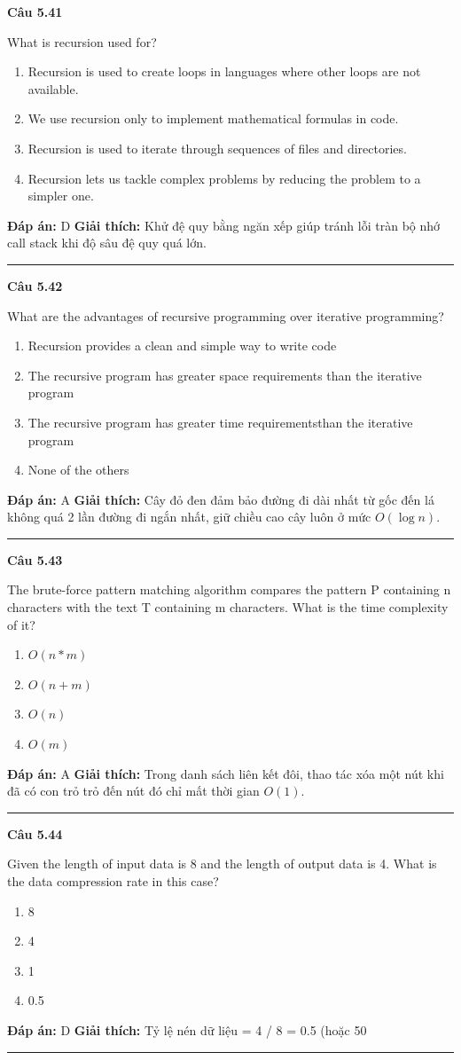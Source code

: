 \documentclass[11pt,a4paper]{article}
\newenvironment{question}[1]{%
  \par\vspace{1em}\noindent\textbf{\large Câu #1}\par\vspace{0.4em}
}{%
  \par\vspace{1em}\hrule\vspace{0.6em}
}
\newenvironment{choices}{%
  \begin{enumerate}[label=\textbf{\Alph*.},leftmargin=2.2em,itemsep=2pt,topsep=3pt]
}{%
  \end{enumerate}
}
\newcommand{\choice}{\item}
\begin{document}
\begin{question}{5.41}
What is recursion used for?
\begin{choices}
\choice Recursion is used to create loops in languages where other loops are not available.
\choice We use recursion only to implement mathematical formulas in code.
\choice Recursion is used to iterate through sequences of files and directories.
\choice Recursion lets us tackle complex problems by reducing the problem to a simpler one.
\end{choices}
\textbf{Đáp án:} D
\textbf{Giải thích:} Khử đệ quy bằng ngăn xếp giúp tránh lỗi tràn bộ nhớ call stack khi độ sâu đệ quy quá lớn.
\end{question}

\begin{question}{5.42}
What are the advantages of recursive programming over iterative programming?
\begin{choices}
\choice Recursion provides a clean and simple way to write code
\choice The recursive program has greater space requirements than the iterative program
\choice The recursive program has greater time requirementsthan the iterative program
\choice None of the others
\end{choices}
\textbf{Đáp án:} A
\textbf{Giải thích:} Cây đỏ đen đảm bảo đường đi dài nhất từ gốc đến lá không quá 2 lần đường đi ngắn nhất, giữ chiều cao cây luôn ở mức $O(\log n)$.
\end{question}

\begin{question}{5.43}
The brute-force pattern matching algorithm compares the pattern P containing n characters with the text T containing m characters. What is the time complexity of it?
\begin{choices}
\choice $O(n * m)$
\choice $O(n + m)$
\choice $O(n)$
\choice $O(m)$
\end{choices}
\textbf{Đáp án:} A
\textbf{Giải thích:} Trong danh sách liên kết đôi, thao tác xóa một nút khi đã có con trỏ trỏ đến nút đó chỉ mất thời gian $O(1)$.
\end{question}

\begin{question}{5.44}
Given the length of input data is 8 and the length of output data is 4. What is the data compression rate in this case?
\begin{choices}
\choice 8
\choice 4
\choice 1
\choice 0.5
\end{choices}
\textbf{Đáp án:} D
\textbf{Giải thích:} Tỷ lệ nén dữ liệu = 4 / 8 = 0.5 (hoặc 50%
\end{question}
\end{document}

